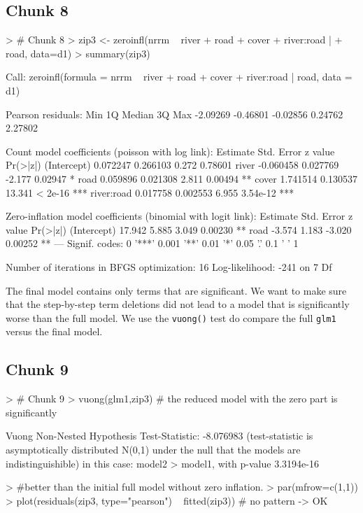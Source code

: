 \documentclass{article}
\begin{document}
\subsection{Chunk 8}
\begin{Schunk}
\begin{Sinput}
> # Chunk 8
> zip3 <- zeroinfl(nrrm ~ river + road + cover + river:road |
+                    road, data=d1)
> summary(zip3)
\end{Sinput}
\begin{Soutput}
Call:
zeroinfl(formula = nrrm ~ river + road + cover + river:road | road, data = d1)

Pearson residuals:
     Min       1Q   Median       3Q      Max 
-2.09269 -0.46801 -0.02856  0.24762  2.27802 

Count model coefficients (poisson with log link):
             Estimate Std. Error z value Pr(>|z|)    
(Intercept)  0.072247   0.266103   0.272  0.78601    
river       -0.060458   0.027769  -2.177  0.02947 *  
road         0.059896   0.021308   2.811  0.00494 ** 
cover        1.741514   0.130537  13.341  < 2e-16 ***
river:road   0.017758   0.002553   6.955 3.54e-12 ***

Zero-inflation model coefficients (binomial with logit link):
            Estimate Std. Error z value Pr(>|z|)   
(Intercept)   17.942      5.885   3.049  0.00230 **
road          -3.574      1.183  -3.020  0.00252 **
---
Signif. codes:  0 '***' 0.001 '**' 0.01 '*' 0.05 '.' 0.1 ' ' 1 

Number of iterations in BFGS optimization: 16 
Log-likelihood:  -241 on 7 Df
\end{Soutput}
\end{Schunk}

The final model contains only terms that are significant. We want to make sure that the step-by-step term deletions did not lead to a model that is significantly worse than the full model. We use the \verb!vuong()! test do compare the full \verb!glm1! versus the final model.

\subsection{Chunk 9}
\begin{Schunk}
\begin{Sinput}
> # Chunk 9
> vuong(glm1,zip3) # the reduced model with the zero part is significantly
\end{Sinput}
\begin{Soutput}
Vuong Non-Nested Hypothesis Test-Statistic: -8.076983 
(test-statistic is asymptotically distributed N(0,1) under the
 null that the models are indistinguishible)
in this case:
model2 > model1, with p-value 3.3194e-16 
\end{Soutput}
\begin{Sinput}
>   #better than the initial full model without zero inflation.
> par(mfrow=c(1,1))
> plot(residuals(zip3, type="pearson") ~ fitted(zip3)) # no pattern -> OK
\end{Sinput}
\end{Schunk}
\end{document}

